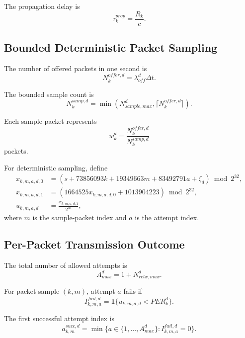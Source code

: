\documentclass[11pt]{article}
\begin{document}
The propagation delay is
\begin{equation}
  \tau^{prop}_k = \frac{R_k}{c}.
\end{equation}

\subsection{Bounded Deterministic Packet Sampling}

The number of offered packets in one second is
\begin{equation}
  N^{offer,d}_k = \lambda^{d}_{off}\Delta t.
\end{equation}

The bounded sample count is
\begin{equation}
  N^{samp,d}_k = \min\left(N^{d}_{sample,max}, \lceil N^{offer,d}_k \rceil \right).
\end{equation}

Each sample packet represents
\begin{equation}
  w^{d}_k = \frac{N^{offer,d}_k}{N^{samp,d}_k}
\end{equation}
packets.

For deterministic sampling, define
\begin{align}
  x_{k,m,a,d,0}
  &= \left(
    s
    + 73856093k
    + 19349663m
    + 83492791a
    + \zeta_d
  \right)\bmod 2^{32}, \\
  x_{k,m,a,d,1}
  &= \left(1664525x_{k,m,a,d,0} + 1013904223\right)\bmod 2^{32}, \\
  u_{k,m,a,d}
  &= \frac{x_{k,m,a,d,1}}{2^{32}},
\end{align}
where $m$ is the sample-packet index and $a$ is the attempt index.

\subsection{Per-Packet Transmission Outcome}

The total number of allowed attempts is
\begin{equation}
  A^{d}_{max} = 1 + N^{d}_{retx,max}.
\end{equation}

For packet sample $(k,m)$, attempt $a$ fails if
\begin{equation}
  I^{fail,d}_{k,m,a} = \mathbf{1}\{u_{k,m,a,d} < PER^{d}_k\}.
\end{equation}

The first successful attempt index is
\begin{equation}
  a^{succ,d}_{k,m}
  =
  \min\{a \in \{1,\dots,A^{d}_{max}\} : I^{fail,d}_{k,m,a}=0\}.
\end{equation}
\end{document}
